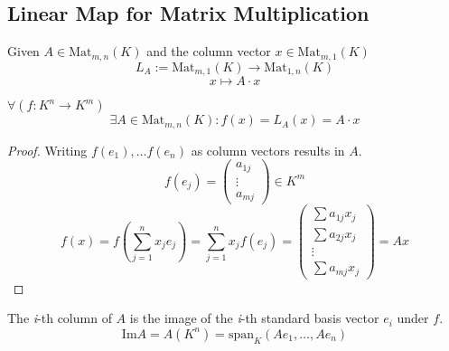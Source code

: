 \subsection{Linear Map for Matrix Multiplication}
\begin{definition}[\(L_A\)]
   Given \(A \in \text{Mat}_{m,n}(K)\) and the column vector \(x \in \text{Mat}_{m,1}(K)\)
   \[L_{A} := \text{Mat}_{m,1}(K) \to \text{Mat}_{1,n}(K)\]
   \[x \mapsto A \cdot x\]
\end{definition}

\begin{corollary}\label{cor:linmap_mat}
   \(\forall (f: K^n \to K^m)\)
   \[\exists A \in \text{Mat}_{m,n}(K): f(x) = L_{A}(x) = A \cdot x\]
\end{corollary}
\begin{proof}
   Writing \(f(e_1), \ldots f(e_n)\) as column vectors results in \(A\).
   \[f(e_j) = \begin{pmatrix} a_{1j} \\ \vdots \\ a_{mj} \end{pmatrix} \in K^m\]
   \[f(x) = f\left(\sum_{j=1}^n x_j e_j\right) = \sum_{j=1}^n x_j f(e_j) =
   \begin{pmatrix}\sum a_{1j} x_j \\ \sum a_{2j} x_j \\ \vdots \\ \sum a_{mj} x_j\end{pmatrix} = Ax\]
\end{proof}
\begin{remark}
   The \textit{i}-th column of \(A\) is the image of the \textit{i}-th standard basis vector \(e_i\) under \(f\).
   \[\text{Im}A = A(K^n) = \text{span}_K(Ae_1, \ldots, Ae_n)\]
\end{remark}

